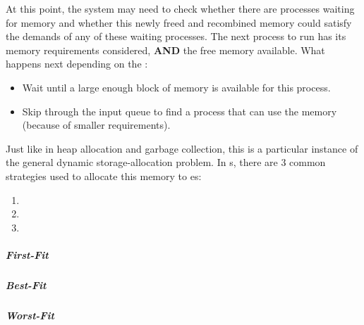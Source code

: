 At this point, the system may need to check whether there are processes waiting for memory and whether this newly freed and recombined memory could satisfy the demands of any of these waiting processes.
The next process to run has its memory requirements considered, \textbf{AND} the free memory available.
What happens next depending on the :
\begin{itemize}[noitemsep]
\item Wait until a large enough block of memory is available for this process.
\item Skip through the input queue to find a process that can use the memory (because of smaller requirements).
\end{itemize}

Just like in heap allocation and garbage collection, this is a particular instance of the general dynamic storage-allocation problem.
In s, there are 3 common strategies used to allocate this memory to es:
\begin{enumerate}[noitemsep]
\item {}
\item {}
\item {}
\end{enumerate}

\subparagraph{First-Fit}\label{subpar:First_Fit}
\subparagraph{Best-Fit}\label{subpar:Best_Fit}
\subparagraph{Worst-Fit}\label{subpar:Worst_Fit}

